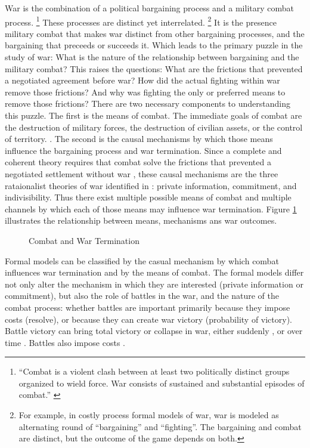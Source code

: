War is the combination of a political bargaining process and a military combat process. %
\footnote{%
  ``Combat is a violent clash between at least two politically
  distinct groups organized to wield force. War consists of sustained
  and substantial episodes of combat.'' \parencite{Reiter2003} %
} %
These processes are distinct yet interrelated.%
\footnote{%
  For example, in costly process formal models of war, war is modeled
  as alternating round of ``bargaining'' and ``fighting''. %
  The bargaining and combat are distinct, but the outcome of the game
  depends on both. %
} %
It is the presence military combat that makes war distinct from other bargaining processes, and the bargaining that preceeds or succeeds it. %
Which leads to the primary puzzle in the study of war: What is the nature of the relationship between bargaining and the military combat? 
This raises the questions:
What are the frictions that prevented a negotiated agreement before war?
How did the actual fighting within war remove those frictions?
And why was fighting the only or preferred means to remove those frictions? 
There are two necessary components to understanding this puzzle. %
The first is the means of combat. %
The immediate goals of combat are the destruction of military forces, the destruction of civilian assets, or the control of territory.
\parencite[30]{Reiter2003}. %
The second is the causal mechanisms by which those means influence the bargaining process and war termination. %
Since a complete and coherent theory requires that combat solve the frictions that prevented a negotiated settlement without war \parencite{LeventogluSlantchev2007}, these causal mechanisms are the three rataionalist theories of war identified in \textcite{Fearon1995}: private information, commitment, and indivisibility. %
Thus there exist multiple possible means of combat and multiple channels by which each of those means may influence war termination.
Figure \ref{bonds_battles:fig:combat-causal-diagram} illustrates the relationship between means, mechanisms ans war outcomes.

\begin{figure}[htpb]
  \centering
  
  \caption{Combat and War Termination}
  \label{bonds_battles:fig:combat-causal-diagram}
\end{figure}


Formal models can be classified by the casual mechanism by which combat influences war termination and by the means of combat. %
The formal models differ not only alter the mechanism in which they are interested (private information or commitment), but also the role of battles in the war, and the nature of the combat process: whether battles are important primarily because they impose costs (resolve), or because they can create war victory (probability of victory). %
Battle victory can bring total victory or collapse in war, either suddenly \parencites{Powell2004}{Wagner2000}{LeventogluSlantchev2007}, or over time \parencites{Slantchev2003}{SmithStam2004}. 
Battles also impose costs \parencites{FilsonWerner2002}{Powell2004}{LeventogluSlantchev2007}. %

